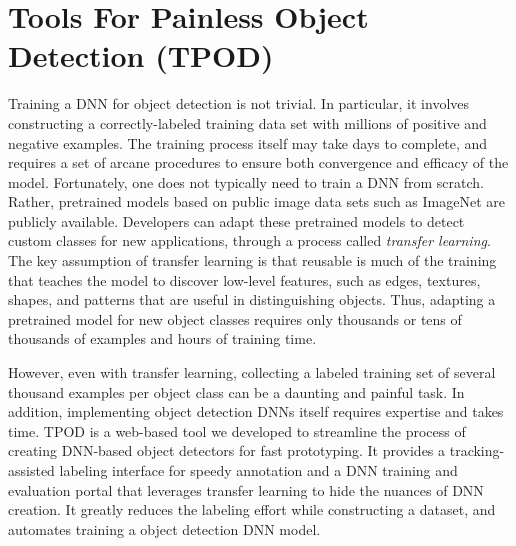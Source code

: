 \section{Tools For Painless Object Detection (TPOD)}
\label{sec: app-dev-tpod}

Training a DNN for object detection is not trivial.  In particular, it involves
constructing a correctly-labeled training data set with millions of positive and
negative examples. The training process itself may take days to complete, and
requires a set of arcane procedures to ensure both convergence and efficacy of
the model. Fortunately, one does not typically need to train a DNN from scratch.
Rather, pretrained models based on public image data sets such as ImageNet are
publicly available. Developers can adapt these pretrained models to detect
custom classes for new applications, through a process called \emph{transfer
learning}.  The key assumption of transfer learning is that reusable is much of
the training that teaches the model to discover low-level features, such as
edges, textures, shapes, and patterns that are useful in distinguishing objects.
Thus, adapting a pretrained model for new object classes requires only thousands
or tens of thousands of examples and hours of training time. 

However, even with transfer learning, collecting a labeled training set of
several thousand examples per object class can be a daunting and painful task.
In addition, implementing object detection DNNs itself requires expertise and
takes time. TPOD is a web-based tool we developed to streamline the process of
creating DNN-based object detectors for fast prototyping. It provides a
tracking-assisted labeling interface for speedy annotation and a DNN training
and evaluation portal that leverages transfer learning to hide the nuances of
DNN creation. It greatly reduces the labeling effort while constructing a
dataset, and automates training a object detection DNN model.



